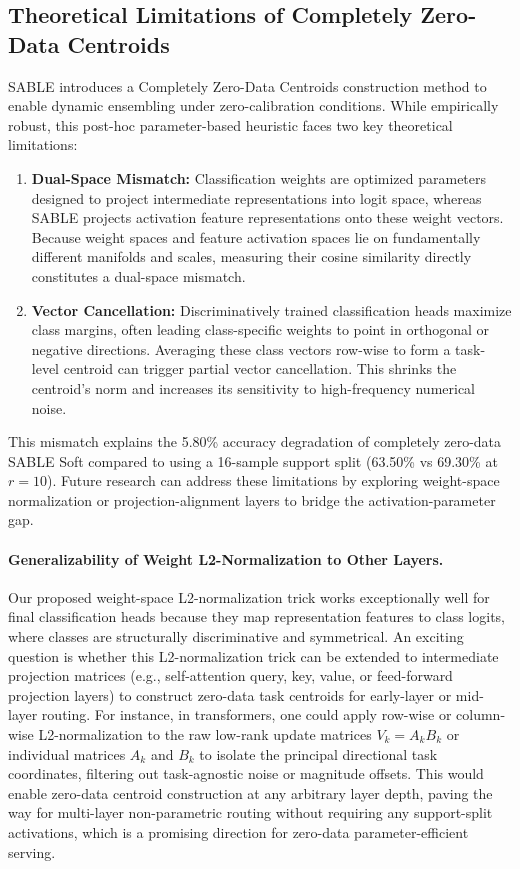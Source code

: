 \subsection{Theoretical Limitations of Completely Zero-Data Centroids}
SABLE introduces a Completely Zero-Data Centroids construction method to enable dynamic ensembling under zero-calibration conditions. While empirically robust, this post-hoc parameter-based heuristic faces two key theoretical limitations:
\begin{enumerate}
    \item \textbf{Dual-Space Mismatch:} Classification weights are optimized parameters designed to project intermediate representations into logit space, whereas SABLE projects activation feature representations onto these weight vectors. Because weight spaces and feature activation spaces lie on fundamentally different manifolds and scales, measuring their cosine similarity directly constitutes a dual-space mismatch.
    \item \textbf{Vector Cancellation:} Discriminatively trained classification heads maximize class margins, often leading class-specific weights to point in orthogonal or negative directions. Averaging these class vectors row-wise to form a task-level centroid can trigger partial vector cancellation. This shrinks the centroid's norm and increases its sensitivity to high-frequency numerical noise.
\end{enumerate}
This mismatch explains the 5.80\% accuracy degradation of completely zero-data SABLE Soft compared to using a 16-sample support split (63.50\% vs 69.30\% at $r=10$). Future research can address these limitations by exploring weight-space normalization or projection-alignment layers to bridge the activation-parameter gap.

\paragraph{Generalizability of Weight L2-Normalization to Other Layers.} Our proposed weight-space L2-normalization trick works exceptionally well for final classification heads because they map representation features to class logits, where classes are structurally discriminative and symmetrical. An exciting question is whether this L2-normalization trick can be extended to intermediate projection matrices (e.g., self-attention query, key, value, or feed-forward projection layers) to construct zero-data task centroids for early-layer or mid-layer routing. For instance, in transformers, one could apply row-wise or column-wise L2-normalization to the raw low-rank update matrices $V_k = A_k B_k$ or individual matrices $A_k$ and $B_k$ to isolate the principal directional task coordinates, filtering out task-agnostic noise or magnitude offsets. This would enable zero-data centroid construction at any arbitrary layer depth, paving the way for multi-layer non-parametric routing without requiring any support-split activations, which is a promising direction for zero-data parameter-efficient serving.

